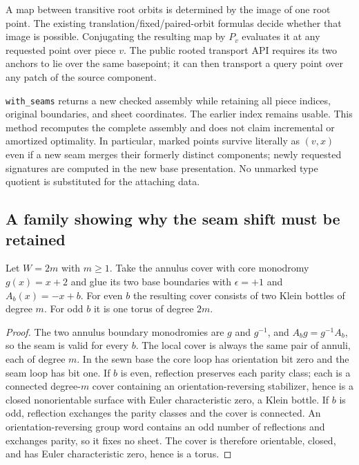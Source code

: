 A map between transitive root orbits is determined by the image of one
root point.  The existing translation/fixed/paired-orbit formulas decide
whether that image is possible.  Conjugating the resulting map by $P_v$
evaluates it at any requested point over piece $v$.  The public rooted
transport API requires its two anchors to lie over the same basepoint;
it can then transport a query point over any patch of the source component.

\texttt{with\_seams} returns a new checked assembly while retaining all
piece indices, original boundaries, and sheet coordinates.  The earlier
index remains usable.  This method recomputes the complete assembly and
does not claim incremental or amortized optimality.  In particular, marked
points survive literally as $(v,x)$ even if a new seam merges their formerly
distinct components; newly requested signatures are computed in the new
base presentation.  No unmarked type quotient is substituted for the
attaching data.

\subsection{A family showing why the seam shift must be retained}

\begin{proposition}
Let $W=2m$ with $m\ge1$.  Take the annulus cover with core monodromy
$g(x)=x+2$ and glue its two base boundaries with $\epsilon=+1$ and
$A_b(x)=-x+b$.  For even $b$ the resulting cover consists of two Klein
bottles of degree $m$.  For odd $b$ it is one torus of degree $2m$.
\end{proposition}
\begin{proof}
The two annulus boundary monodromies are $g$ and $g^{-1}$, and
$A_b g=g^{-1}A_b$, so the seam is valid for every $b$.  The local cover
is always the same pair of annuli, each of degree $m$.  In the sewn base
the core loop has orientation bit zero and the seam loop has bit one.
If $b$ is even, reflection preserves each parity class; each is a connected
degree-$m$ cover containing an orientation-reversing stabilizer, hence is
a closed nonorientable surface with Euler characteristic zero, a Klein
bottle.  If $b$ is odd, reflection exchanges the parity classes and the
cover is connected.  An orientation-reversing group word contains an odd
number of reflections and exchanges parity, so it fixes no sheet.  The
cover is therefore orientable, closed, and has Euler characteristic zero,
hence is a torus.
\end{proof}

